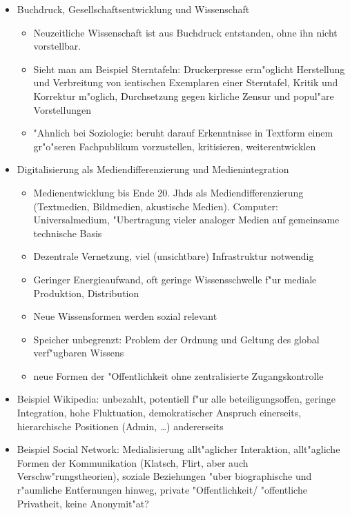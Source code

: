 \begin{itemize}
\begin{itemize}
				(funktionale) Differenzierung der Gesellschaft
		\end{itemize}
	\item
		Buchdruck, Gesellschaftsentwicklung und Wissenschaft
		\begin{itemize}
			\item
				Neuzeitliche Wissenschaft ist aus Buchdruck entstanden, ohne ihn nicht vorstellbar.
			\item
				Sieht man am Beispiel Sterntafeln: Druckerpresse erm"oglicht Herstellung und Verbreitung von ientischen Exemplaren einer Sterntafel, Kritik und Korrektur m"oglich, Durchsetzung gegen kirliche Zensur und popul"are Vorstellungen
			\item
				"Ahnlich bei Soziologie: beruht darauf Erkenntnisse in Textform einem gr"o"seren Fachpublikum vorzustellen, kritisieren, weiterentwicklen
		\end{itemize}
	\item
		Digitalisierung als Mediendifferenzierung und Medienintegration
		\begin{itemize}
			\item
				Medienentwicklung bis Ende 20. Jhds als Mediendifferenzierung (Textmedien, Bildmedien, akustische Medien). Computer: Universalmedium, "Ubertragung vieler analoger Medien auf gemeinsame technische Basis
			\item
				Dezentrale Vernetzung, viel (unsichtbare) Infrastruktur notwendig
			\item
				Geringer Energieaufwand, oft geringe Wissensschwelle f"ur mediale Produktion, Distribution
			\item
				Neue Wissensformen werden sozial relevant
			\item
				Speicher unbegrenzt: Problem der Ordnung und Geltung des global verf"ugbaren Wissens
			\item
				neue Formen der "Offentlichkeit ohne zentralisierte Zugangskontrolle
		\end{itemize}
	\item
		Beispiel Wikipedia: unbezahlt, potentiell f"ur alle beteiligungsoffen, geringe Integration, hohe Fluktuation, demokratischer Anspruch einerseits, hierarchische Positionen (Admin, \dots) andererseits
	\item
		Beispiel Social Network: Medialisierung allt"aglicher Interaktion, allt"agliche Formen der Kommunikation (Klatsch, Flirt, aber auch Verschw"rungstheorien), soziale Beziehungen "uber biographische und r"aumliche Entfernungen hinweg, private "Offentlichkeit/ "offentliche Privatheit, keine Anonymit"at?


\end{itemize}
